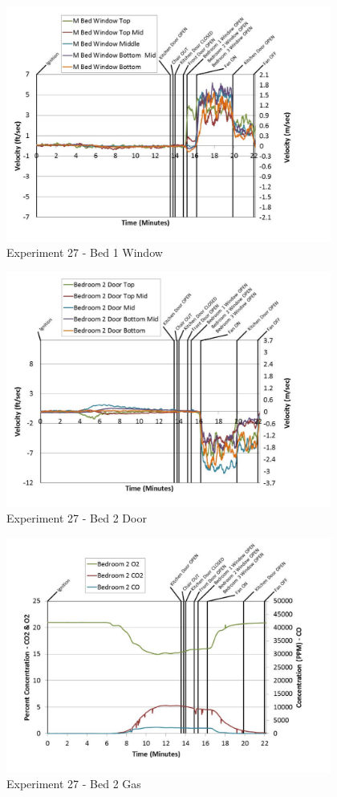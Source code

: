 \documentclass{article}
\begin{document}
\begin{appendices}
	\begin{figure}[h!]
		\centering
		\includegraphics[height=3.05in]{0_Images/Results_Charts/Exp_27_Charts/Bed1Window.pdf}
		\caption{Experiment 27 - Bed 1 Window}
	\end{figure}
 
	\clearpage

	\begin{figure}[h!]
		\centering
		\includegraphics[height=3.05in]{0_Images/Results_Charts/Exp_27_Charts/Bed2Door.pdf}
		\caption{Experiment 27 - Bed 2 Door}
	\end{figure}
 

	\begin{figure}[h!]
		\centering
		\includegraphics[height=3.05in]{0_Images/Results_Charts/Exp_27_Charts/Bed2Gas.pdf}
		\caption{Experiment 27 - Bed 2 Gas}
	\end{figure}
 

\end{appendices}
\end{document}
